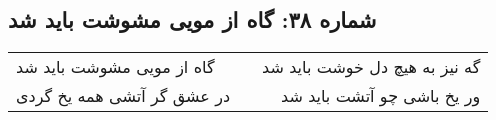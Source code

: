 \begin{center}
\section*{شماره ۳۸: گاه از مویی مشوشت باید شد}
\label{sec:038}
\begin{longtable}{l p{0.5cm} r}
گاه از مویی مشوشت باید شد
&&
گه نیز به هیچ دل خوشت باید شد
\\
در عشق گر آتشی همه یخ گردی
&&
ور یخ باشی چو آتشت باید شد
\\
\end{longtable}
\end{center}
